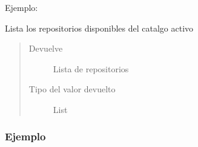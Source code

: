 \documentclass[a4paper,12pt,spanish]{sphinxmanual}
\begin{document}
\begin{fulllineitems}
\begin{fulllineitems}
\begin{quote}
\begin{description}
\end{description}\end{quote}
\begin{description}
\item[{Ejemplo:}] \leavevmode
\begin{sphinxVerbatim}[commandchars=\\\{\}]
   
  
\end{sphinxVerbatim}

\end{description}

\end{fulllineitems}


\begin{fulllineitems}
\label{\detokenize{openerm.OermClient:openerm.OermClient.OermClient.repos}}
Lista los repositorios disponibles del catalgo activo
\begin{quote}\begin{description}
\item[{Devuelve}] \leavevmode
Lista de repositorios

\item[{Tipo del valor devuelto}] \leavevmode
List

\end{description}\end{quote}
\subsubsection*{Ejemplo}


\end{fulllineitems}
\end{fulllineitems}
\end{document}
